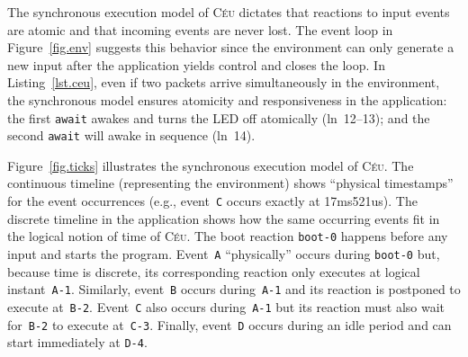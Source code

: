 \documentclass[sigplan,10pt,review,anonymous]{acmart}\settopmatter{printfolios=true,printccs=false,printacmref=false}
\newcommand{\CEU}{\textsc{C\'{e}u}\xspace}
\newcommand{\code}[1] {{\small{\texttt{#1}}}}
\begin{document}
The synchronous execution model of \CEU dictates that reactions to input events
are atomic and that incoming events are never lost.
%
The event loop in Figure~\ref{fig.env} suggests this behavior since the
environment can only generate a new input after the application yields control
and closes the loop.
%
In Listing~\ref{lst.ceu}, even if two packets arrive simultaneously in the
environment, the synchronous model ensures atomicity and responsiveness in the
application:
    the first \code{await} awakes and turns the LED off atomically
    (ln~12--13);
    and the second \code{await} will awake in sequence (ln~14).
%

Figure~\ref{fig.ticks} illustrates the synchronous execution model of \CEU.
%
The continuous timeline (representing the environment) shows
``physical timestamps'' for the event occurrences (e.g., event~\code{C}
occurs exactly at 17ms521us).
%
The discrete timeline in the application shows how the same occurring events
fit in the logical notion of time of \CEU.
%
The boot reaction \code{boot-0} happens before any input and starts the
program.
%
Event~\code{A} ``physically'' occurs during \code{boot-0} but, because time
is discrete, its corresponding reaction only executes at logical
instant~\code{A-1}.
%
Similarly, event~\code{B} occurs during~\code{A-1} and its reaction is
postponed to execute at~\code{B-2}.
%
Event~\code{C} also occurs during~\code{A-1} but its reaction must also wait
for~\code{B-2} to execute at~\code{C-3}.
%
Finally, event~\code{D} occurs during an idle period and can start immediately
at \code{D-4}.
%
\end{document}
